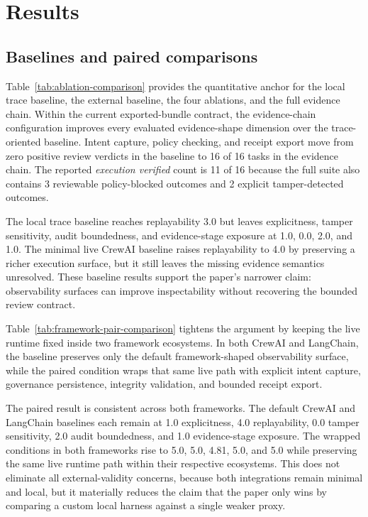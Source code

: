 \section{Results}
\label{sec:results}

\subsection{Baselines and paired comparisons}

Table~\ref{tab:ablation-comparison} provides the quantitative anchor for the local trace baseline, the external baseline, the four ablations, and the full evidence chain. Within the current exported-bundle contract, the evidence-chain configuration improves every evaluated evidence-shape dimension over the trace-oriented baseline. Intent capture, policy checking, and receipt export move from zero positive review verdicts in the baseline to 16 of 16 tasks in the evidence chain. The reported \emph{execution verified} count is 11 of 16 because the full suite also contains 3 reviewable policy-blocked outcomes and 2 explicit tamper-detected outcomes.

The local trace baseline reaches replayability 3.0 but leaves explicitness, tamper sensitivity, audit boundedness, and evidence-stage exposure at 1.0, 0.0, 2.0, and 1.0. The minimal live CrewAI baseline raises replayability to 4.0 by preserving a richer execution surface, but it still leaves the missing evidence semantics unresolved. These baseline results support the paper's narrower claim: observability surfaces can improve inspectability without recovering the bounded review contract.

Table~\ref{tab:framework-pair-comparison} tightens the argument by keeping the live runtime fixed inside two framework ecosystems. In both CrewAI and LangChain, the baseline preserves only the default framework-shaped observability surface, while the paired condition wraps that same live path with explicit intent capture, governance persistence, integrity validation, and bounded receipt export.



The paired result is consistent across both frameworks. The default CrewAI and LangChain baselines each remain at 1.0 explicitness, 4.0 replayability, 0.0 tamper sensitivity, 2.0 audit boundedness, and 1.0 evidence-stage exposure. The wrapped conditions in both frameworks rise to 5.0, 5.0, 4.81, 5.0, and 5.0 while preserving the same live runtime path within their respective ecosystems. This does not eliminate all external-validity concerns, because both integrations remain minimal and local, but it materially reduces the claim that the paper only wins by comparing a custom local harness against a single weaker proxy.


